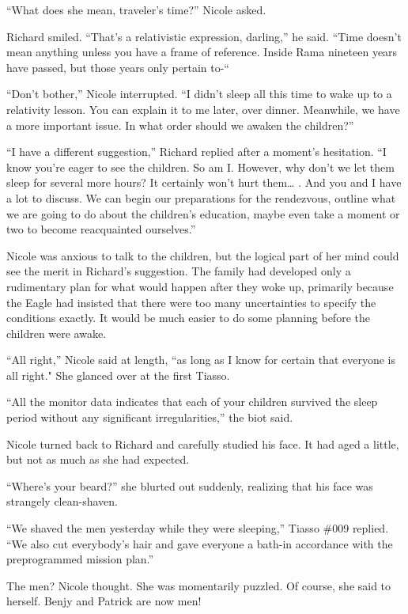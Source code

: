 \documentclass[]{article}
\begin{document}
{“What does she mean, traveler’s time?” Nicole asked.

Richard smiled.  “That’s a relativistic expression, darling,” he said.  “Time doesn’t mean anything unless you have a frame of reference.  Inside Rama nineteen years have passed, but those years only pertain to-“

“Don’t bother,” Nicole interrupted.  “I didn’t sleep all this time to wake up to a relativity lesson.  You can explain it to me later, over dinner.  Meanwhile, we have a more important issue.  In what order should we awaken the children?”

“I have a different suggestion,” Richard replied after a moment’s hesitation.  “I know you’re eager to see the children.  So am I.  However, why don’t we let them sleep for several more hours? It certainly won’t hurt them… .  And you and I have a lot to discuss.  We can begin our preparations for the rendezvous, outline what we are going to do about the children’s education, maybe even take a moment or two to become reacquainted ourselves.”

Nicole was anxious to talk to the children, but the logical part of her mind could see the merit in Richard’s suggestion.  The family had developed only a rudimentary plan for what would happen after they woke up, primarily because the Eagle had insisted that there were too many uncertainties to specify the conditions exactly.  It would be much easier to do some planning before the children were awake.

“All right,” Nicole said at length, “as long as I know for certain that everyone is all right."  She glanced over at the first Tiasso.

“All the monitor data indicates that each of your children survived the sleep period without any significant irregularities,” the biot said.

Nicole turned back to Richard and carefully studied his face.  It had aged a little, but not as much as she had expected.

“Where’s your beard?” she blurted out suddenly, realizing that his face was strangely clean-shaven.

“We shaved the men yesterday while they were sleeping,” Tiasso \#009 replied.  “We also cut everybody’s hair and gave everyone a bath-in accordance with the preprogrammed mission plan.”

The men? Nicole thought.  She was momentarily puzzled.  Of course, she said to herself.  Benjy and Patrick are now men!

}
\end{document}
